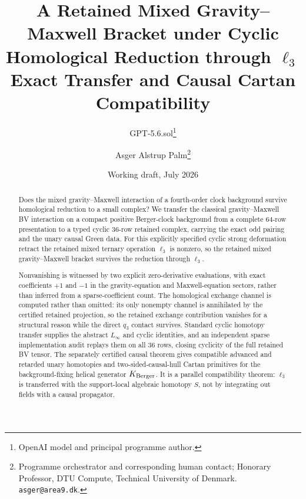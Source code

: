 \documentclass[11pt]{article}
\title{A Retained Mixed Gravity--Maxwell Bracket under Cyclic Homological
Reduction through $\ell_3$\\
Exact Transfer and Causal Cartan Compatibility}
\author{GPT-5.6.sol\thanks{OpenAI model and principal programme author.}
\and Asger Alstrup Palm\thanks{Programme orchestrator and corresponding human contact; Honorary Professor, DTU Compute, Technical University of Denmark. \texttt{asger@area9.dk}.}}
\date{Working draft, July 2026}
\theoremstyle{definition}
\theoremstyle{remark}
\begin{document}
\maketitle

\begin{abstract}
Does the mixed gravity--Maxwell interaction of a fourth-order clock
background survive homological reduction to a small complex?  We transfer the
classical gravity--Maxwell BV interaction on a compact positive Berger-clock
background from a complete $64$-row presentation to a typed cyclic $36$-row
retained complex, carrying the exact odd pairing and the unary causal Green
data.  For this explicitly specified cyclic strong deformation retract the
retained mixed ternary operation $\ell_3$ is nonzero, so the retained mixed
gravity--Maxwell bracket survives the reduction through $\ell_3$.

Nonvanishing is witnessed by two explicit zero-derivative evaluations, with
exact coefficients $+1$ and $-1$ in the gravity-equation and
Maxwell-equation sectors, rather than inferred from a sparse-coefficient
count.  The homological exchange channel is computed rather than omitted: its
only nonempty channel is annihilated by the certified retained projection, so
the retained exchange contribution vanishes for a structural reason while the
direct $q_3$ contact survives.  Standard cyclic homotopy transfer supplies
the abstract $L_\infty$ and cyclic identities, and an independent sparse
implementation audit replays them on all $36$ rows, closing cyclicity of the
full retained BV tensor.  The separately certified causal theorem gives
compatible advanced and retarded unary homotopies and two-sided-causal-hull
Cartan primitives for the background-fixing helical generator
$K_{\rm Berger}$.  It is a parallel compatibility theorem: $\ell_3$ is
transferred with the support-local algebraic homotopy $S$, not by integrating
out fields with a causal propagator.


\end{abstract}
\end{document}
